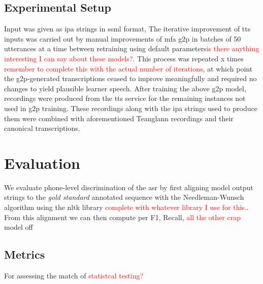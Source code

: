 \documentclass[thesis]{cluu}
\newcommand{\todo}[1]{\textcolor{red}{#1}}
\begin{document}
\subsection{Experimental Setup}
Input was given as \gls{ipa} strings in \gls{ssml} format, 
The iterative improvement of \gls{tts} inputs was carried out by manual improvements of \gls{mfa} \gls{g2p} \parencite{mcauliffeMontrealForcedAligner2017} in batches of 50 utterances at a time between retraining using default parameters\todo{is there anything interesting I can say about these models?}. This process was repeated x times \todo{remember to complete this with the actual number of iterations}, at which point the \gls{g2p}-generated transcriptions ceased to improve meaningfully and required no changes to yield plausible learner speech.
After training the above \gls{g2p} model, recordings were produced from the \gls{tts} service for the remaining instances not used in \gls{g2p} training. These recordings along with the \gls{ipa} strings used to produce them were combined with aforementioned Teanglann recordings and their canonical transcriptions.

\section{Evaluation}
We evaluate phone-level discrimination of the \gls{asr} by first aligning model output strings to the \textit{gold standard} annotated sequence with the Needleman-Wunsch algorithm \parencite{needlemanGeneralMethodApplicable1970} using the \gls{nltk} library \todo{complete with whatever library I use for this.}. From this alignment we can then compute \gls{per} F1, Recall, \todo{all the other crap} 
model off \parencite{leungCNNRNNCTCBasedEndtoend2019}


\subsection{Metrics}
For assessing the match of 
\todo{statistcal testing?}
\end{document}
